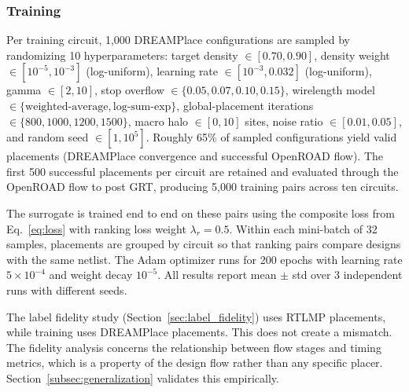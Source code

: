 \documentclass[sigconf,anonymous,review,9pt]{acmart}
\begin{document}
\subsubsection{Training}
Per training circuit, 1{,}000 DREAMPlace configurations are sampled
by randomizing 10 hyperparameters: target density
$\in [0.70, 0.90]$, density weight $\in [10^{-5}, 10^{-3}]$
(log-uniform), learning rate $\in [10^{-3}, 0.032]$ (log-uniform),
gamma $\in [2, 10]$, stop overflow
$\in \{0.05, 0.07, 0.10, 0.15\}$, wirelength model \\
$\in \{\text{weighted-average}, \text{log-sum-exp}\}$, global-placement iterations
$\in \{800, 1000, 1200, 1500\}$, macro halo $\in [0, 10]$ sites,
noise ratio $\in [0.01, 0.05]$, and random seed $\in [1, 10^5]$.
Roughly 65\% of sampled configurations yield valid placements
(DREAMPlace convergence and successful OpenROAD flow). The
first 500 successful placements per circuit are retained and
evaluated through the OpenROAD flow to post GRT, producing 5{,}000
training pairs across ten circuits.

The surrogate is trained end to end on these pairs using the composite
loss from Eq.~\ref{eq:loss} with ranking loss weight
$\lambda_r = 0.5$. Within each mini-batch of 32 samples, placements
are grouped by circuit so that ranking pairs compare designs with the
same netlist. The Adam optimizer runs for 200 epochs with learning
rate $5 \times 10^{-4}$ and weight decay $10^{-5}$. All results
report mean $\pm$ std over 3 independent runs with different seeds.

The label fidelity study (Section~\ref{sec:label_fidelity}) uses
RTLMP placements, while training uses DREAMPlace placements. This
does not create a mismatch. The fidelity analysis concerns the
relationship between flow stages and timing metrics, which is a property
of the design flow rather than any specific placer.
Section~\ref{subsec:generalization} validates this empirically.
\end{document}
